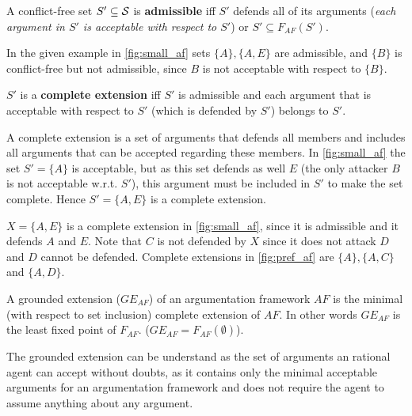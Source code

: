 \begin{definition}
	A conflict-free set $S' \subseteq \S$ is \textbf{admissible} iff $S'$ defends all of its arguments (\textit{each argument in $S'$ is acceptable with respect to $S'$}) or $S' \subseteq F_{AF}(S')$.
\end{definition}

\begin{exa}
In the given example in \autoref{fig:small_af} sets $\{A\}, \{A, E\}$ are admissible, and $\{B\}$ is conflict-free but not admissible, since $B$ is not acceptable with respect to $\{B\}$.
\end{exa}

\begin{definition}
$S'$ is a \textbf{complete extension} iff  $S'$ is admissible and each argument that is acceptable with respect to $S'$ (which is defended by $S'$) belongs to $S'$.
\end{definition}

\begin{remark}
	A complete extension is a set of arguments that defends all members and includes all arguments that can be accepted regarding these members. In \autoref{fig:small_af} the set $S'=\{A\}$ is acceptable, but as this set defends as well $E$ (the only attacker $B$ is not acceptable w.r.t. $S'$), this argument must be included in $S'$ to make the set complete. Hence $S' = \{A, E\}$ is a complete extension. 
\end{remark}


\begin{exa}
$X = \{A, E\}$ is a complete extension in \autoref{fig:small_af}, since it is admissible and it defends $A$ and $E$. Note that $C$ is not defended by $X$ since it does not attack $D$ and $D$ cannot be defended.
Complete extensions in \autoref{fig:pref_af} are $\{A\}, \{A, C\}$ and $\{A, D\}$.
\end{exa}


\begin{definition}
A grounded extension ($GE_{AF}$) of an argumentation framework $AF$ is the minimal (with respect to set inclusion) complete extension of $AF$. In other words $GE_{AF}$ is the least fixed point of $F_{AF}$. ($GE_{AF} = F_{AF}(\emptyset)$).
\end{definition}

\begin{remark}
	The grounded extension can be understand as the set of arguments an rational agent can accept without doubts, as it contains only the minimal acceptable arguments for an argumentation framework and does not require the agent to assume anything about any argument.
\end{remark}

